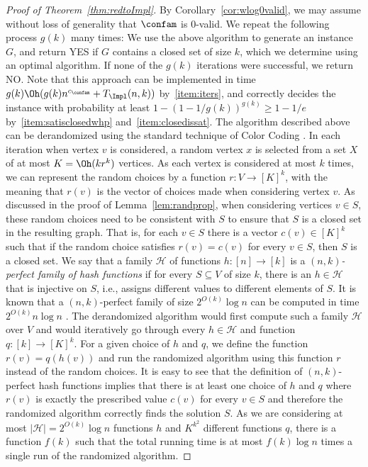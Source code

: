 \begin{proof}[Proof of Theorem~\ref{thm:redtoImpl}]
By Corollary~\ref{cor:wlog0valid}, we may assume without loss of generality that $\confam$ is 0-valid.
We repeat the following process $g(k)$ many times: We use the above algorithm to generate an \Implication instance $G$, and return YES if $G$ contains a closed set of size $k$, which we determine using an optimal \Implication algorithm. If none of the $g(k)$ iterations were successful, we return NO. Note that this approach can be implemented in time $g(k)\Oh(g(k)n^{c_\confam} + T_\Impl(n,k))$ by~\ref{item:iters}, and correctly decides the instance with probability at least $1-(1-1/g(k))^{g(k)} \ge 1-1/e$ by~\ref{item:satisclosedwhp} and~\ref{item:closedissat}.
%
The algorithm described above can be derandomized using the standard technique of Color Coding \cite{AlonYZ95}. In each iteration when vertex $v$ is considered, a random vertex $x$ is selected from a set $X$ of at most $K=\Oh(kr^k)$ vertices. As each vertex is considered at most $k$ times, we can represent the random choices by a function $r:V\to [K]^k$,  with the meaning that $r(v)$ is the vector of choices made when considering vertex $v$.  As discussed in the proof of Lemma~\ref{lem:randprop}, when considering vertices $v\in S$, these random choices need to be consistent with $S$ to ensure that $S$ is a closed set in the resulting graph. That is, for each $v\in S$ there is a vector $c(v)\in [K]^k$ such that if the random choice satisfies $r(v)=c(v)$ for every $v\in S$, then $S$ is a closed set.
%
We say that a family $\mathcal{H}$ of functions $h:[n]\to [k]$ is a {\em $(n,k)$-perfect family of hash functions} if for every $S\subseteq V$ of size $k$, there is an $h\in \mathcal{H}$ that is injective on $S$, i.e., assigns different values to different elements of $S$. It is known that a $(n,k)$-perfect family of size $2^{O(k)}\log n$ can be computed in time $2^{O(k)}n\log n$ \cite{AlonYZ95}. The derandomized algorithm would first compute such a family $\mathcal{H}$ over $V$ and would iteratively go through every $h\in \mathcal{H}$ and function $q:[k]\to [K]^k$. For a given choice of $h$ and $q$, we define the function $r(v)=q(h(v))$ and run the randomized algorithm using this function $r$ instead of the random choices. It is easy to see that the definition of $(n,k)$-perfect hash functions implies that there is at least one choice of $h$ and $q$ where $r(v)$ is exactly the prescribed value $c(v)$ for every $v\in S$ and therefore the randomized algorithm correctly finds the solution $S$. As we are considering at most $|\mathcal{H}|=2^{O(k)}\log n$ functions $h$ and $K^{k^2}$ different functions $q$, there is a function $f(k)$ such that the total running time is at most $f(k)\log n$ times a single run of the randomized algorithm.
\end{proof}
%
%
%
%
